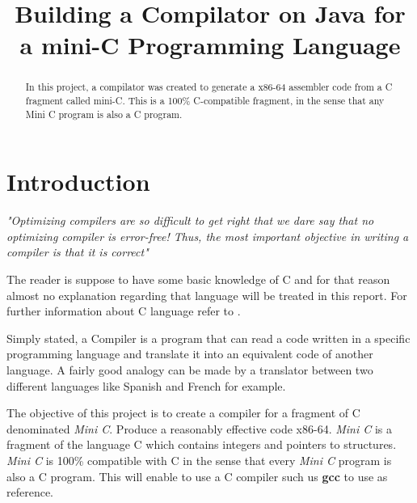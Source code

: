 \documentclass[conference]{IEEEtran}
\begin{document}
\title{Building a Compilator on Java for a mini-C Programming Language}

\author{
\and
{}
}
\maketitle

\tableofcontents
\newpage

\begin{abstract}
In this project, a compilator was created to generate a x86-64 assembler code from a C fragment called mini-C.
This is a 100\% C-compatible fragment, in the sense that any Mini C program is also a C program. 
\end{abstract}

\IEEEpeerreviewmaketitle

\section{Introduction}
\textit{"Optimizing compilers are so difficult to get right that we dare say that no optimizing compiler is error-free! Thus, the most important objective in writing a compiler is that it is correct"}\cite{DRAGON_BOOK}

The reader is suppose to have some basic knowledge of C and for that reason almost no explanation regarding that language will be treated in this report. For further information about C language refer to \cite{LANGUAGE_C}.

Simply stated, a Compiler is a program that can read a code written in a specific programming language and translate it into an equivalent code of another language. A fairly good analogy can be made by a translator between two different languages like Spanish and French for example.

The objective of this project is to create a compiler for a fragment of C denominated \textit{Mini C}. Produce a reasonably effective code x86-64. \textit{Mini C} is a fragment of the language C which contains integers and pointers to structures. \textit{Mini C} is 100\% compatible with C in the sense that every \textit{Mini C} program is also a C program. This will enable to use a C compiler such us \textbf{gcc} to use as reference. 
\end{document}
